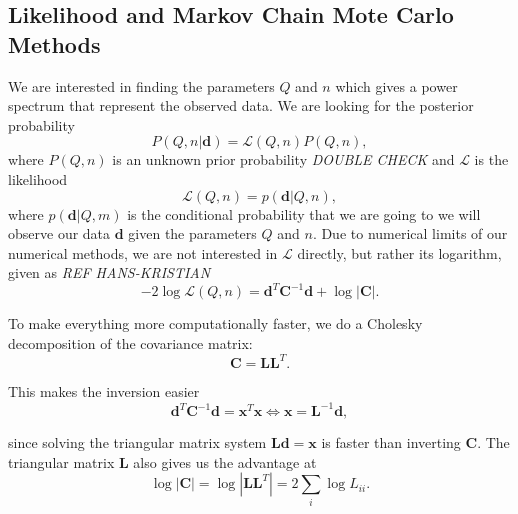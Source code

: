 \documentclass{emulateapj}
\begin{document}
\subsection{Likelihood and Markov Chain Mote Carlo Methods}
We are interested in finding the parameters $Q$ and $n$ which gives a power spectrum that represent the observed data. We are looking for the posterior probability
\begin{equation}
P(Q,n|\mathbf{d}) = \mathcal{L}(Q,n)P(Q,n),
\end{equation}
where $P(Q,n)$ is an unknown prior probability \emph{DOUBLE CHECK} and $\mathcal{L}$ is the likelihood
\begin{equation}
\mathcal{L}(Q,n) = p(\mathbf{d}|Q,n),
\end{equation}
where $p(\mathbf{d}|Q,m)$ is the conditional probability that we are going to we will observe our data $\mathbf{d}$ given the parameters $Q$ and $n$. Due to numerical limits of our numerical methods, we are not interested in $\mathcal{L}$ directly, but rather its logarithm, given as \emph{REF HANS-KRISTIAN}
\begin{equation}
-2\log \mathcal{L}(Q,n) =  \mathbf{d}^T\mathbf{C}^{-1}\mathbf{d} + \log|\mathbf{C}|.
\end{equation}

To make everything more computationally faster, we do a Cholesky decomposition of the covariance matrix:
\begin{equation}
\mathbf{C} = \mathbf{L}\mathbf{L}^T.
\end{equation} 
 
This makes the inversion easier
\begin{equation}
\mathbf{d}^T\mathbf{C}^{-1}\mathbf{d} = \mathbf{x}^T\mathbf{x} \Leftrightarrow \mathbf{x} = \mathbf{L}^{-1}\mathbf{d},
\end{equation}

since solving the triangular matrix system $\mathbf{L}\mathbf{d} = \mathbf{x}$ is faster than inverting $\mathbf{C}$. The triangular matrix $\mathbf{L}$ also gives us the advantage at
\begin{equation}
\log|\mathbf{C}| = \log |\mathbf{L}\mathbf{L}^T| = 2\sum_i \log L_{ii}.
\end{equation}
\end{document}
